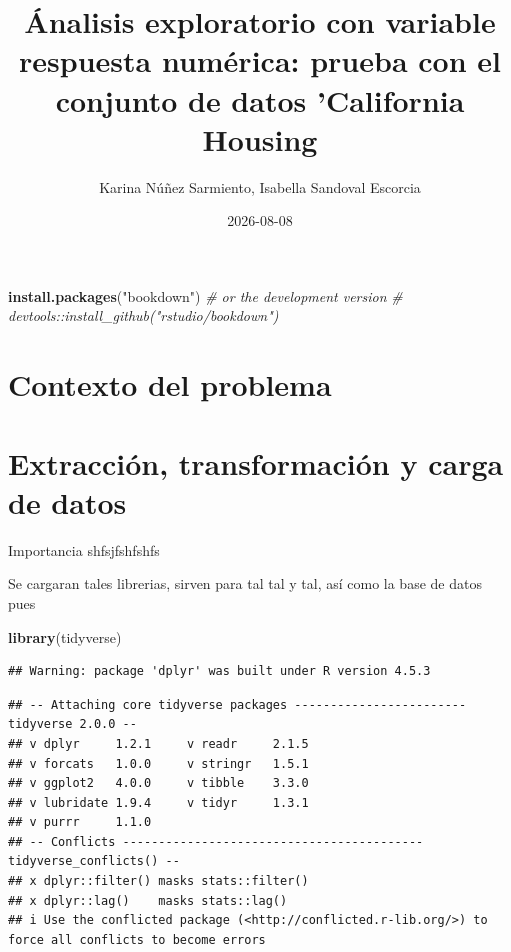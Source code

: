 \documentclass[
]{book}
\title{Ánalisis exploratorio con variable respuesta numérica: prueba con el conjunto de datos 'California Housing}
\author{Karina Núñez Sarmiento, Isabella Sandoval Escorcia}
\date{2026-08-08}
\newenvironment{Shaded}{\begin{snugshade}}{\end{snugshade}}
\newcommand{\CommentTok}[1]{\textcolor[rgb]{0.56,0.35,0.01}{\textit{#1}}}
\newcommand{\FunctionTok}[1]{\textcolor[rgb]{0.13,0.29,0.53}{\textbf{#1}}}
\newcommand{\NormalTok}[1]{#1}
\newcommand{\StringTok}[1]{\textcolor[rgb]{0.31,0.60,0.02}{#1}}
\begin{document}
\maketitle

{
\setcounter{tocdepth}{1}
\tableofcontents
}
\begin{Shaded}
\begin{Highlighting}[]
\FunctionTok{install.packages}\NormalTok{(}\StringTok{"bookdown"}\NormalTok{)}
\CommentTok{\# or the development version}
\CommentTok{\# devtools::install\_github("rstudio/bookdown")}
\end{Highlighting}
\end{Shaded}

\chapter{Contexto del problema}\label{contexto-del-problema}

\chapter{Extracción, transformación y carga de datos}\label{intro}

Importancia shfsjfshfshfs

Se cargaran tales librerias, sirven para tal tal y tal, así como la base de datos pues

\begin{Shaded}
\begin{Highlighting}[]
\FunctionTok{library}\NormalTok{(tidyverse)}
\end{Highlighting}
\end{Shaded}

\begin{verbatim}
## Warning: package 'dplyr' was built under R version 4.5.3
\end{verbatim}

\begin{verbatim}
## -- Attaching core tidyverse packages ------------------------ tidyverse 2.0.0 --
## v dplyr     1.2.1     v readr     2.1.5
## v forcats   1.0.0     v stringr   1.5.1
## v ggplot2   4.0.0     v tibble    3.3.0
## v lubridate 1.9.4     v tidyr     1.3.1
## v purrr     1.1.0     
## -- Conflicts ------------------------------------------ tidyverse_conflicts() --
## x dplyr::filter() masks stats::filter()
## x dplyr::lag()    masks stats::lag()
## i Use the conflicted package (<http://conflicted.r-lib.org/>) to force all conflicts to become errors
\end{verbatim}
\end{document}
